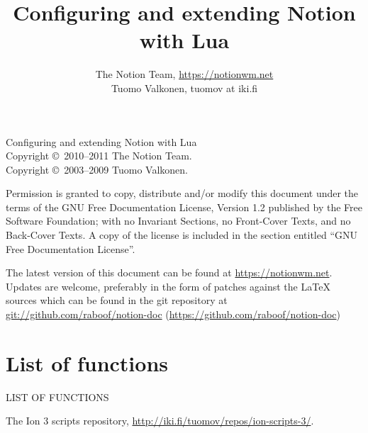 \documentclass[english,a4paper,11pt,oldtoc,mctitle]{rapport3}
\title{Configuring and extending Notion with Lua}
\author{The Notion Team, \url{https://notionwm.net} \\ 
	Tuomo Valkonen, tuomov at iki.fi}
\begin{document}
\maketitle

Configuring and extending Notion with Lua\\
Copyright \copyright\  2010--2011 The Notion Team.\\
Copyright \copyright\  2003--2009 Tuomo Valkonen.

Permission is granted to copy, distribute and/or modify this document
under the terms of the GNU Free Documentation License, Version 1.2
published by the Free Software Foundation;
with no Invariant Sections, no Front-Cover Texts, and no Back-Cover Texts.
A copy of the license is included in the section entitled ``GNU
Free Documentation License''.

The latest version of this document can be found at 
\url{https://notionwm.net}. Updates are
welcome, preferably in the form of patches against the \LaTeX{} sources which
can be found in the git repository at 
\url{git://github.com/raboof/notion-doc} 
(\url{https://github.com/raboof/notion-doc})

\tableofcontents













\appendix





\chapter*{List of functions}
%
         {\MakeUppercase{List of functions}}%

\makeatletter
\def\fnlisti#1{\@dottedtocline{1}{0em}{1.5em}{\lstinline!#1!}{\pageref{fn:#1}}}
{\parskip\z@}
\makeatother

\begin{htmlonly}
\newcommand{\fnlisti}[1]{\fnref{#1}\\}

\end{htmlonly}

\printindex

\begin{thebibliography}{9}
     The Ion 3 scripts repository,
        \url{http://iki.fi/tuomov/repos/ion-scripts-3/}.
\end{thebibliography}
\end{document}
